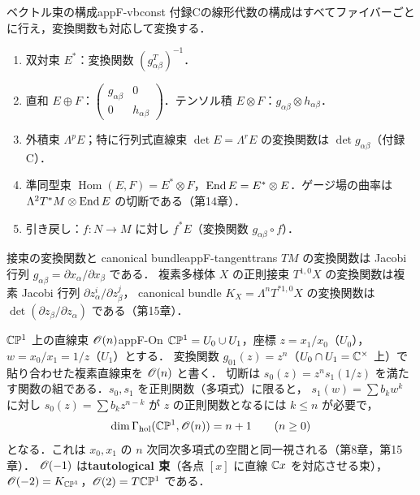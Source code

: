 \begin{myex}{ベクトル束の構成}{appF-vbconst}
付録Cの線形代数の構成はすべてファイバーごとに行え，変換関数も対応して変換する．
\begin{enumerate}
\item 双対束 $E^*$：変換関数 $(g_{\alpha\beta}^{T})^{-1}$．
\item 直和 $E\oplus F$：$\begin{pmatrix}g_{\alpha\beta}&0\\0&h_{\alpha\beta}\end{pmatrix}$．テンソル積 $E\otimes F$：$g_{\alpha\beta}\otimes h_{\alpha\beta}$．
\item 外積束 $\Lambda^pE$；特に行列式直線束 $\det E=\Lambda^rE$ の変換関数は $\det g_{\alpha\beta}$（付録C）．
\item 準同型束 $\operatorname{Hom}(E,F)=E^*\otimes F$，$\operatorname{End} E=E^*\otimes E$．ゲージ場の曲率は $\Lambda^2T^*M\otimes\operatorname{End} E$ の切断である（第14章）．
\item 引き戻し：$f\colon N\to M$ に対し $f^*E$（変換関数 $g_{\alpha\beta}\circ f$）．
\end{enumerate}
\end{myex}

\begin{myex}{接束の変換関数と canonical bundle}{appF-tangenttrans}
$TM$ の変換関数は Jacobi 行列 $g_{\alpha\beta}=\partial x_\alpha/\partial x_\beta$ である．
複素多様体 $X$ の正則接束 $T^{1,0}X$ の変換関数は複素 Jacobi 行列 $\partial z_\alpha^i/\partial z_\beta^j$，
canonical bundle $K_X=\Lambda^nT^{*1,0}X$ の変換関数は $\det(\partial z_\beta/\partial z_\alpha)$ である（第15章）．
\end{myex}

\begin{myex}{$\mathbb{C}\mathbb{P}^1$ 上の直線束 $\mathscr{O}(n)$}{appF-On}
$\mathbb{C}\mathbb{P}^1=U_0\cup U_1$，座標 $z=x_1/x_0$（$U_0$），$w=x_0/x_1=1/z$（$U_1$）とする．
変換関数 $g_{01}(z)=z^n$（$U_0\cap U_1=\mathbb{C}^\times$ 上）で貼り合わせた複素直線束を $\mathscr{O}(n)$ と書く．
切断は $s_0(z)=z^ns_1(1/z)$ を満たす関数の組である．$s_0,s_1$ を正則関数（多項式）に限ると，
$s_1(w)=\sum b_kw^k$ に対し $s_0(z)=\sum b_kz^{n-k}$ が $z$ の正則関数となるには $k\leq n$ が必要で，
\[
\dim\Gamma_{\text{hol}}(\mathbb{C}\mathbb{P}^1,\mathscr{O}(n))=n+1\qquad(n\geq0)
\]
となる．これは $x_0,x_1$ の $n$ 次同次多項式の空間と同一視される（第8章，第15章）．
$\mathscr{O}(-1)$ は\textbf{tautological 束}（各点 $[x]$ に直線 $\mathbb{C} x$ を対応させる束），$\mathscr{O}(-2)=K_{\mathbb{C}\mathbb{P}^1}$，$\mathscr{O}(2)=T\mathbb{C}\mathbb{P}^1$ である．
\end{myex}

